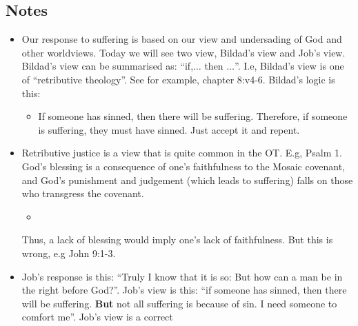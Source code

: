 \subsection*{Notes}
\begin{itemize}
  \item{Our response to suffering is based on our view and undersading of God
  and other worldviews. Today we will see two view, Bildad's view and Job's
  view. Bildad's view can be summarised as: ``if,$\dots$ then $\dots$''. I.e,
  Bildad's view is one of ``retributive theology''. See for example, chapter
  8:v4-6. Bildad's logic is this:
  \begin{itemize}
    \item{If someone has sinned, then there will be suffering. Therefore, if
  someone is suffering, they must have sinned. Just accept it and repent.}
  \end{itemize}
  }
  \item{Retributive justice is a view that is quite common in the OT. E.g,
  Psalm 1. God's blessing is a consequence of one's faithfulness to the
  Mosaic covenant, and God's punishment and judgement (which leads to
  suffering) falls on those who transgress the covenant. 
  \begin{itemize}
    \item{}
  \end{itemize}
  Thus, a lack of blessing would imply one's lack of faithfulness. But this is wrong, e.g John 9:1-3.}
  \item{Job's response is this: ``Truly I know that it is so: But how can a
  man be in the right before God?''. Job's view is this: ``if someone has
  sinned, then there will be suffering. \textbf{But} not all suffering is
  because of sin. I need someone to comfort me''. Job's view is a correct
}
\end{itemize}
